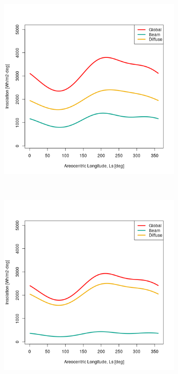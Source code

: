 \begin{figure}[H]
\begin{subfigure}[t]{\subfigureWidth}
  		\includegraphics[height=\graphicsHeight]{sections/martian-environment/plots/variation-of-global-beam-and-diffuse-insolation-on-mars-horizontal-surface-as-a-function-of-areocentric-longitude-for-tau1-and-phi205.png}
  		\label{fig:sub:insolation-ls-tau-factor-1}
  	\end{subfigure}\\[0.8ex]
    \begin{subfigure}[t]{\subfigureWidth}
      \centering
  		\includegraphics[height=\graphicsHeight]{sections/martian-environment/plots/variation-of-global-beam-and-diffuse-insolation-on-mars-horizontal-surface-as-a-function-of-areocentric-longitude-for-tau2-and-phi205.png}

\end{subfigure}
\end{figure}
